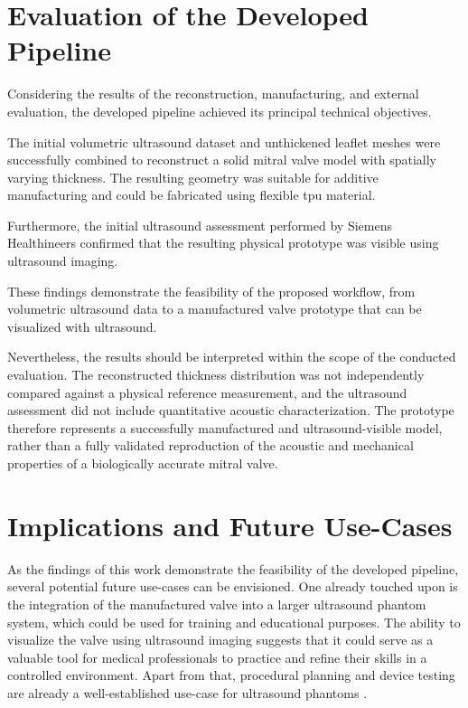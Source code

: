 \section{Evaluation of the Developed Pipeline}\label{sec:evaluation}
Considering the results of the reconstruction, manufacturing, and external evaluation, the developed pipeline achieved its principal technical objectives.

The initial volumetric ultrasound dataset and unthickened leaflet meshes were successfully combined to reconstruct a solid mitral valve model with spatially varying thickness. The resulting geometry was suitable for additive manufacturing and could be fabricated using flexible \gls{tpu} material.

Furthermore, the initial ultrasound assessment performed by Siemens Healthineers confirmed that the resulting physical prototype was visible using ultrasound imaging.

These findings demonstrate the feasibility of the proposed workflow, from volumetric ultrasound data to a manufactured valve prototype that can be visualized with ultrasound.

Nevertheless, the results should be interpreted within the scope of the conducted evaluation. The reconstructed thickness distribution was not independently compared against a physical reference measurement, and the ultrasound assessment did not include quantitative acoustic characterization. The prototype therefore represents a successfully manufactured and ultrasound-visible model, rather than a fully validated reproduction of the acoustic and mechanical properties of a biologically accurate mitral valve.

\section{Implications and Future Use-Cases}\label{sec:use_cases}

As the findings of this work demonstrate the feasibility of the developed pipeline, several potential future use-cases can be envisioned. One already touched upon is the integration of the manufactured valve into a larger ultrasound phantom system, which could be used for training and educational purposes. The ability to visualize the valve using ultrasound imaging suggests that it could serve as a valuable tool for medical professionals to practice and refine their skills in a controlled environment. Apart from that, procedural planning and device testing are already a well-established use-case for ultrasound phantoms \cite{pavlykova20263d}.

